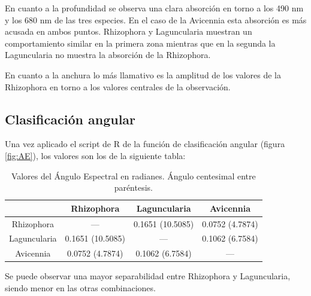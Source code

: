 En cuanto a la profundidad se observa una clara absorción en torno a los 490 nm y los 680 nm de las tres especies. En el caso de la Avicennia esta absorción es más acusada en ambos puntos. Rhizophora y Laguncularia muestran un comportamiento similar en la primera zona mientras que en la segunda la Laguncularia no muestra la absorción de la Rhizophora.\Sep

En cuanto a la anchura lo más llamativo es la amplitud de los valores de la Rhizophora en torno a los valores centrales de la observación.

\subsection{Clasificación angular}
Una vez aplicado el script de R de la función de clasificación angular (figura \ref{fig:AE}), los valores son los de la siguiente tabla:

\begin{table}[ht]
	\centering
	\caption[Valores de Ángulo Espectral]{Valores del Ángulo Espectral en radianes. Ángulo centesimal entre paréntesis.}
	\begin{tabular}{|c|c|c|c|}
	\hline
	& Rhizophora & Laguncularia & Avicennia \\
	\hline
	Rhizophora & --- & 0.1651 (10.5085) & 0.0752 (4.7874) \\
	\hline
	Laguncularia & 0.1651 (10.5085) & --- & 0.1062 (6.7584) \\
	\hline
	Avicennia & 0.0752 (4.7874) & 0.1062 (6.7584) & --- \\
	\hline
	\end{tabular}
\end{table}

Se puede observar una mayor separabilidad entre Rhizophora y Laguncularia, siendo menor en las otras combinaciones.